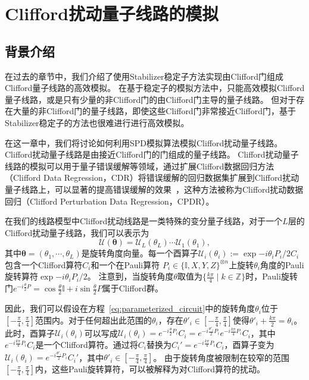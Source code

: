 \chapter{Clifford扰动量子线路的模拟}


\section{背景介绍}
在过去的章节中，我们介绍了使用Stabilizer稳定子方法实现由Clifford门组成Clifford量子线路的高效模拟。
在基于稳定子的模拟方法中，只能高效模拟Clifford量子线路，或是只有少量的非Clifford门的由Clifford门主导的量子线路。
但对于存在大量的非Clifford门的量子线路，即使这些Clifford门非常接近Clifford门，基于Stabilizer稳定子的方法也很难进行进行高效模拟。

在这一章中，我们将讨论如何利用SPD模拟算法模拟Clifford扰动量子线路。Clifford扰动量子线路是由接近Clifford门的门组成的量子线路。
Clifford扰动量子线路的模拟可以用于量子错误缓解等领域，通过扩展Clifford数据回归方法（Clifford Data Regression，CDR）将错误缓解的回归数据集扩展到Clifford扰动量子线路上，可以显著的提高错误缓解的效果~\cite{zhang2024clifford}，这种方法被称为Clifford扰动数据回归（Clifford Perturbation Data Regression，CPDR）。

在我们的线路模型中Clifford扰动线路是一类特殊的变分量子线路，对于一个$L$层的Clifford扰动量子线路，我们可以表示为
\begin{equation}\label{eq:parameterized_circuit}
    \mathcal{U}(\bm{\theta})=\mathcal{U}_L(\theta_L)  \cdots \mathcal{U}_1(\theta_1),
\end{equation}
其中$\bm{\theta}=(\theta_1,\cdots,\theta_L)$是旋转角度向量。每一个酉算子$\mathcal{U}_i(\theta_i):=\exp{-i \theta_i P_i / 2}C_i $ 包含一个Clifford算符$C_i$和一个在Pauli算符 $P_i\in\{\mathbb{I},X,Y,Z\}^{\otimes n}$上旋转$\theta_i$角度的Pauli旋转算符$\exp{-i \theta_i P_i / 2}$。
注意到，当旋转角度$\theta$取值为$\{\frac{k\pi}{4}\mid k\in \mathbb{Z}\}$时，Pauli旋转门$e^{-i\frac{\theta}{2} P}=\cos{\frac{\theta}{2}}\mathbb{I}+i\sin{\frac{\theta}{2}}P$属于Clifford群。

因此，我们可以假设在方程~\eqref{eq:parameterized_circuit}中的旋转角度$\theta_i$位于$[-\frac{\pi}{4},\frac{\pi}{4}]$范围内。对于任何超出此范围的$\theta_i$，存在$\theta'_i\in [-\frac{\pi}{4},\frac{\pi}{4}]$使得$\theta'_i+\frac{k\pi}{2}=\theta_i$。
此时，酉算子$\mathcal{U}_i(\theta_i)$可以写成$\mathcal{U}_i(\theta_i)=e^{-i\frac{\theta}{2} P_i}C_i=e^{-i\frac{\theta'_i}{2} P_i}e^{-i\frac{k\pi}{4} P_i}C_i$，其中$e^{-i\frac{k\pi}{4} P_i}C_i$是一个Clifford算符。通过将$C_i$替换为$C_i'=e^{-i\frac{k\pi}{4} P_i}C_i$，酉算子变为$\mathcal{U}_i(\theta_i)=e^{-i\frac{\theta'_i}{2} P_i}C_i'$，其中$\theta'_i\in [-\frac{\pi}{4},\frac{\pi}{4}]$。
由于旋转角度被限制在较窄的范围$[-\frac{\pi}{4},\frac{\pi}{4}]$内，这些Pauli旋转算符，可以被解释为对Clifford算符的扰动。

